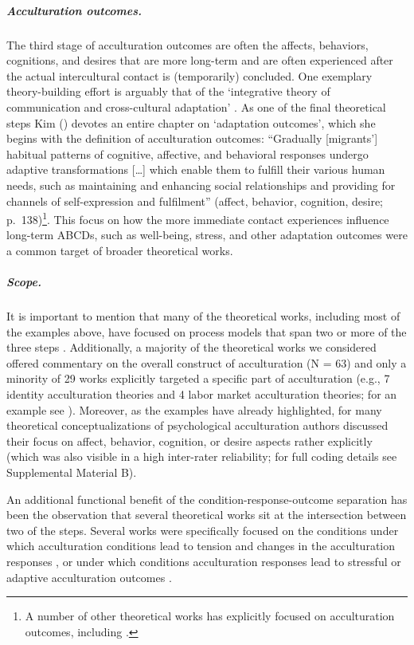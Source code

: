 \subparagraph{Acculturation outcomes.}

The third stage of acculturation outcomes are often the affects,
behaviors, cognitions, and desires that are more long-term and are often
experienced after the actual intercultural contact is (temporarily)
concluded. One exemplary theory-building effort is arguably that of the
`integrative theory of communication and cross-cultural adaptation'
\citep[][]{Kim1988}. As one of the final theoretical steps Kim
(\citeyear[][]{Kim1988}) devotes an entire chapter on `adaptation
outcomes', which she begins with the definition of acculturation
outcomes: ``Gradually {[}migrants'{]} habitual patterns of cognitive,
affective, and behavioral responses undergo adaptive transformations
{[}\ldots{]} which enable them to fulfill their various human needs,
such as maintaining and enhancing social relationships and providing for
channels of self-expression and fulfilment'' (affect, behavior,
cognition, desire;
p.~138)\footnote{A number of other theoretical works has explicitly focused on acculturation outcomes, including \citet[][]{Baird2015, Berry1998, Berry1992, Berry2005, Riedel2011, Rogler1994, Luedicke2011}.}.
This focus on how the more immediate contact experiences influence
long-term ABCDs, such as well-being, stress, and other adaptation
outcomes were a common target of broader theoretical works.

\subparagraph{Scope.}

It is important to mention that many of the theoretical works, including
most of the examples above, have focused on process models that span two
or more of the three steps
\citep[e.g.,][]{Berry1992, Ward2016, Arends-Toth2006a, Rogler1994}.
Additionally, a majority of the theoretical works we considered offered
commentary on the overall construct of acculturation (N = 63) and only a
minority of 29 works explicitly targeted a specific part of
acculturation (e.g., 7 identity acculturation theories and 4 labor
market acculturation theories; for an example see
\citealp{Weinreich2009}). Moreover, as the examples have already
highlighted, for many theoretical conceptualizations of psychological
acculturation authors discussed their focus on affect, behavior,
cognition, or desire aspects rather explicitly (which was also visible
in a high inter-rater reliability; for full coding details see
Supplemental Material B).

An additional functional benefit of the condition-response-outcome
separation has been the observation that several theoretical works sit
at the intersection between two of the steps. Several works were
specifically focused on the conditions under which acculturation
conditions lead to tension and changes in the acculturation responses
\citep[i.e., conditions of change; e.g.,][]{Masgoret2006, Alitolppa-Niitamo2004, Grove1985, Wood2014},
or under which conditions acculturation responses lead to stressful or
adaptive acculturation outcomes
\citep[i.e., conditions of stress; e.g.,][; also see  and Figure S1 in Supplemental Material C]{Ryan2008, Berry1992, Benet-Martinez2005, Salo2015, Wood2014, Hajro2019}.

